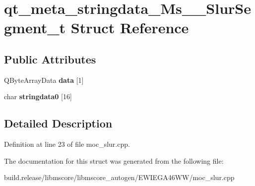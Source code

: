 \hypertarget{structqt__meta__stringdata___ms_____slur_segment__t}{}\section{qt\+\_\+meta\+\_\+stringdata\+\_\+\+Ms\+\_\+\+\_\+\+Slur\+Segment\+\_\+t Struct Reference}
\label{structqt__meta__stringdata___ms_____slur_segment__t}
\subsection*{Public Attributes}
\begin{DoxyCompactItemize}
\item 
\mbox{\label{structqt__meta__stringdata___ms_____slur_segment__t_aef30e0e4a5ca67661d4fdc0fe41a8963}} 
Q\+Byte\+Array\+Data {\bfseries data} \mbox{[}1\mbox{]}
\item 
\mbox{\label{structqt__meta__stringdata___ms_____slur_segment__t_a5e9247712040622535fa7db1708184f1}} 
char {\bfseries stringdata0} \mbox{[}16\mbox{]}
\end{DoxyCompactItemize}


\subsection{Detailed Description}


Definition at line 23 of file moc\+\_\+slur.\+cpp.



The documentation for this struct was generated from the following file\+:\begin{DoxyCompactItemize}
\item 
build.\+release/libmscore/libmscore\+\_\+autogen/\+E\+W\+I\+E\+G\+A46\+W\+W/moc\+\_\+slur.\+cpp\end{DoxyCompactItemize}
